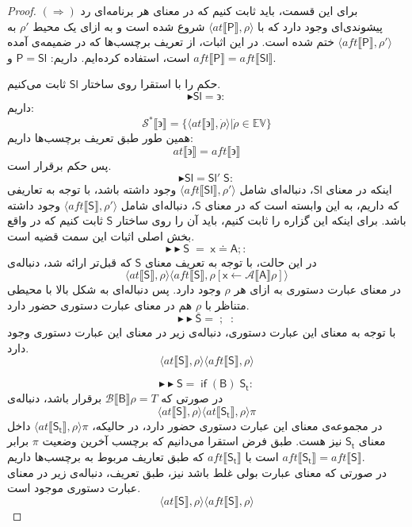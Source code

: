 \begin{proof}
	$(\Rightarrow)$
	برای این قسمت، باید ثابت کنیم که در معنای هر برنامه‌ای رد پیشوندی‌ای وجود دارد که با
	$\langle at\llbracket \mathsf{P} \rrbracket , \rho \rangle$
	شروع شده است و به ازای یک محیط $\rho'$ به 
	$\langle aft\llbracket \mathsf{P} \rrbracket , \rho' \rangle$
	ختم شده است. 
	در این اثبات، از تعریف برچسب‌ها که در ضمیمه‌ی \cite{calcul} آمده است، استفاده کرده‌ایم.
	داریم:
	$\mathsf{P=Sl}$
	و 
	$aft \llbracket \mathsf{P} \rrbracket = aft \llbracket \mathsf{Sl} \rrbracket $.
	
	حکم را با استقرا روی ساختار $\mathsf{Sl}$ ثابت می‌کنیم. 
	$$\blacktriangleright \mathsf{Sl = \backepsilon}:$$
	داریم:
	$$\mathcal{S^*} \llbracket \backepsilon \rrbracket = \{\langle at \llbracket \backepsilon \rrbracket , \dot{\rho} \rangle | \dot{\rho} \in \mathbb{EV}\}$$
	همین طور طبق تعریف برچسب‌ها داریم:
	$$at \llbracket \backepsilon \rrbracket = aft \llbracket \backepsilon \rrbracket$$
	پس حکم برقرار است.
	$$\blacktriangleright \mathsf{Sl =Sl'\;S}:$$
	اینکه در معنای $\mathsf{Sl}$، دنباله‌ای شامل
	 $\langle aft \llbracket \mathsf{Sl} \rrbracket , \rho '\rangle$ وجود داشته باشد، با توجه به تعاریفی که داریم، به این وابسته است که در معنای
	  $\mathsf{S}$،
	   دنباله‌ای شامل $\langle aft \llbracket \mathsf{S} \rrbracket , \rho' \rangle$ وجود داشته باشد. برای اینکه این گزاره را ثابت کنیم، باید آن را روی ساختار $\mathsf{S}$ ثابت کنیم که در واقع بخش اصلی اثبات این سمت قضیه است. 
	$$\blacktriangleright\blacktriangleright \mathsf{S\;=\; x\doteq A;}:$$
	در این حالت، با توجه به تعریف معنای $\mathsf{S}$ که قبل‌تر ارائه شد، دنباله‌ی 
	$$\langle at \llbracket \mathsf{S} \rrbracket ,\rho \rangle \langle aft\llbracket\mathsf{S}\rrbracket , \rho[\mathsf{x}\leftarrow \mathcal{A}\llbracket\mathsf{A}\rrbracket\rho] \rangle $$
	در معنای عبارت‌ دستوری به ازای هر $\rho$ وجود دارد. پس دنباله‌ای به شکل بالا با محیطی متناظر با
	$\underline{\rho}$
	هم در معنای عبارت‌ دستوری حضور دارد.
	$$\blacktriangleright\blacktriangleright \mathsf{S=\; ; \;\;}:$$	 
با توجه به معنای این عبارت‌ دستوری، دنباله‌ی زیر در معنای این عبارت‌ دستوری وجود دارد.
$$\langle at \llbracket \mathsf{S} \rrbracket ,\rho \rangle \langle aft\llbracket\mathsf{S}\rrbracket , \rho \rangle $$

$$\blacktriangleright\blacktriangleright \mathsf{S=\; if\;(B)\;S_t}:$$
	در صورتی که 
	$\mathcal{B}\llbracket\mathsf{B}\rrbracket\rho=\mathit{T}$
	برقرار باشد، دنباله‌ی 
	$$\langle at \llbracket \mathsf{S} \rrbracket , \rho \rangle
	\langle at \llbracket \mathsf{S_t} \rrbracket , \rho \rangle \pi$$
	در مجموعه‌ی معنای این عبارت‌ دستوری حضور دارد، در حالیکه، 
	$\langle at \llbracket \mathsf{S_t} \rrbracket , \rho \rangle \pi$
	داخل معنای $\mathsf{S_t}$ نیز هست. طبق فرض استقرا می‌دانیم که برچسب آخرین وضعیت $\pi$ برابر است با $aft \llbracket \mathsf{S_t} \rrbracket$ که طبق تعاریف مربوط به برچسب‌ها داریم
	$aft \llbracket \mathsf{S_t} \rrbracket=aft \llbracket \mathsf{S} \rrbracket$.\\
	در صورتی که معنای عبارت بولی غلط باشد نیز، طبق تعریف، دنباله‌ی زیر در معنای عبارت‌ دستوری موجود است.
	$$\langle at \llbracket \mathsf{S} \rrbracket ,\rho \rangle \langle aft\llbracket\mathsf{S}\rrbracket , \rho \rangle $$
	

\end{proof}
